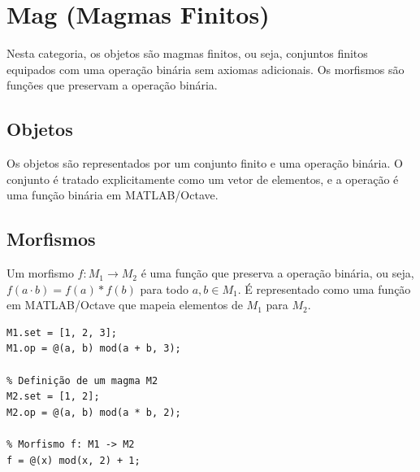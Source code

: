 \section{Mag (Magmas Finitos)}


Nesta categoria, os objetos são magmas finitos, ou seja, conjuntos finitos equipados com uma operação binária sem axiomas adicionais. Os morfismos são funções que preservam a operação binária.

\subsection{Objetos}
Os objetos são representados por um conjunto finito e uma operação binária. O conjunto é tratado explicitamente como um vetor de elementos, e a operação é uma função binária em MATLAB/Octave.

\subsection{Morfismos}
Um morfismo $f: M_1 \to M_2$ é uma função que preserva a operação binária, ou seja, $f(a \cdot b) = f(a) \ast f(b)$ para todo $a, b \in M_1$. É representado como uma função em MATLAB/Octave que mapeia elementos de $M_1$ para $M_2$.

\begin{lstlisting}[caption={Exemplo de Magma e Morfismo}]
% Definição de um magma M1
M1.set = [1, 2, 3];
M1.op = @(a, b) mod(a + b, 3);

% Definição de um magma M2
M2.set = [1, 2];
M2.op = @(a, b) mod(a * b, 2);

% Morfismo f: M1 -> M2
f = @(x) mod(x, 2) + 1;
\end{lstlisting}
